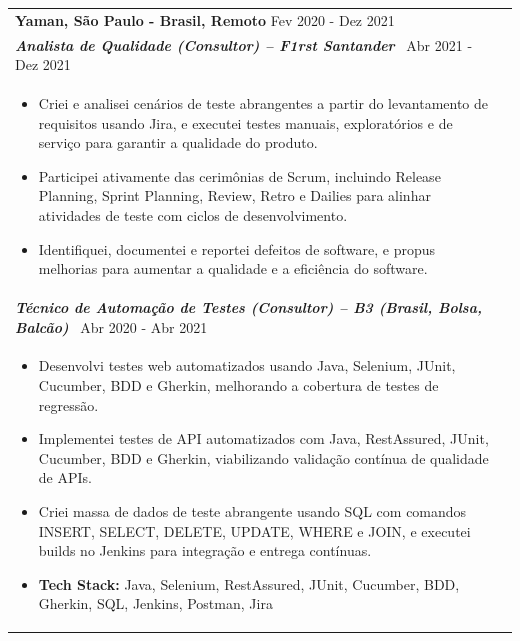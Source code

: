 \documentclass[a4paper,8pt]{article}
\begin{document}
\begin{tabularx}{\linewidth}{ @{}l r@{} }
\textbf{{Yaman, S\~ao Paulo - Brasil, Remoto}} \hfill \color[HTML]{371e77} Fev 2020 - Dez 2021 \\[4pt]
\color[HTML]{371e77}\textbf{\textit{Analista de Qualidade (Consultor) -- F1rst Santander}}\ \hfill \color[HTML]{4B28A4} Abr 2021 - Dez 2021 \\[5pt]
\begin{minipage}[t]{\linewidth}
    \begin{itemize}[nosep,after=\strut, leftmargin=2em, itemsep=2pt]
        \item Criei e analisei cen\'arios de teste abrangentes a partir do levantamento de requisitos usando Jira, e executei testes manuais, explorat\'orios e de servi\c{c}o para garantir a qualidade do produto.
        \item Participei ativamente das cerim\^onias de Scrum, incluindo Release Planning, Sprint Planning, Review, Retro e Dailies para alinhar atividades de teste com ciclos de desenvolvimento.
        \item Identifiquei, documentei e reportei defeitos de software, e propus melhorias para aumentar a qualidade e a efici\^encia do software.
    \end{itemize}
\end{minipage}\\[6pt]
\color[HTML]{371e77}\textbf{\textit{T\'ecnico de Automa\c{c}\~ao de Testes (Consultor) -- B3 (Brasil, Bolsa, Balc\~ao)}}\ \hfill \color[HTML]{4B28A4} Abr 2020 - Abr 2021 \\[5pt]
\begin{minipage}[t]{\linewidth}
    \begin{itemize}[nosep,after=\strut, leftmargin=2em, itemsep=2pt]
        \item Desenvolvi testes web automatizados usando Java, Selenium, JUnit, Cucumber, BDD e Gherkin, melhorando a cobertura de testes de regress\~ao.
        \item Implementei testes de API automatizados com Java, RestAssured, JUnit, Cucumber, BDD e Gherkin, viabilizando valida\c{c}\~ao cont\'inua de qualidade de APIs.
        \item Criei massa de dados de teste abrangente usando SQL com comandos INSERT, SELECT, DELETE, UPDATE, WHERE e JOIN, e executei builds no Jenkins para integra\c{c}\~ao e entrega cont\'inuas.
        \item \textbf{Tech Stack:} Java, Selenium, RestAssured, JUnit, Cucumber, BDD, Gherkin, SQL, Jenkins, Postman, Jira

\end{itemize}
\end{minipage}
\end{tabularx}
\end{document}
